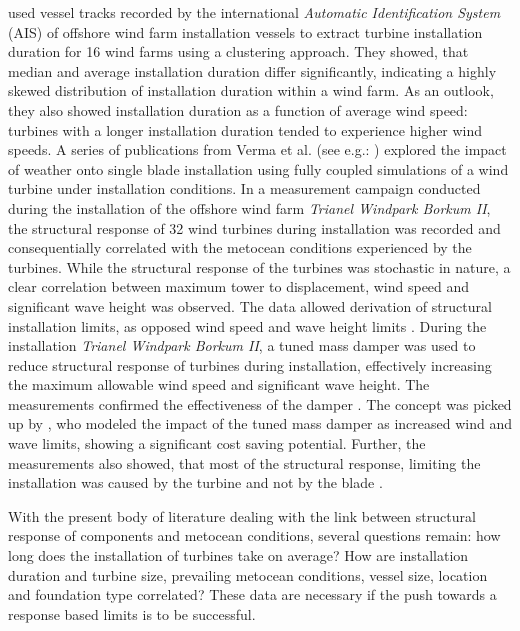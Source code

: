 \documentclass[wes, manuscript]{copernicus}
\begin{document}
\citet{tranberg_determining_2019} used vessel tracks recorded by the international \textit{Automatic Identification System} (AIS) of offshore wind farm installation vessels to extract turbine installation duration for 16 wind farms using a clustering approach. They showed, that median and average installation duration differ significantly, indicating a highly skewed distribution of installation duration within a wind farm. As an outlook, they also showed installation duration as a function of average wind speed: turbines with a longer installation duration tended to experience higher wind speeds. 
A series of publications from Verma et al. (see e.g.: \citet{verma_numerical_2017, verma_impact_2019, verma_response-based_2019, verma_comprehensive_2019, verma_effects_2020}) explored the impact of weather onto single blade installation using fully coupled simulations of a wind turbine under installation conditions. In a measurement campaign conducted during the installation of the offshore wind farm \textit{Trianel Windpark Borkum II}, the structural response of 32 wind turbines during installation was recorded and consequentially correlated with the metocean conditions experienced by the turbines. While the structural response of the turbines was stochastic in nature, a clear correlation between maximum tower to displacement, wind speed and significant wave height was observed. The data allowed derivation of structural installation limits, as 	
opposed wind speed and wave height limits \citep{sander_relative_2020, sander_oscillations_2020, sander_twbii_2020}. During the installation \textit{Trianel Windpark Borkum II}, a tuned mass damper was used to reduce structural response of turbines during installation, effectively increasing the maximum allowable wind speed and significant wave height. The measurements confirmed the effectiveness of the damper \citep{sander_monitoring_2020}. The concept was picked up by \citet{oelker_evaluation_2021}, who modeled the impact of the tuned mass damper as increased wind and wave limits, showing a significant cost saving potential. Further, the measurements also showed, that most of the structural response, limiting the installation was caused by the turbine and not by the blade \citep{stroer_statistical_2022}. 

With the present body of literature dealing with the link between structural response of components and metocean conditions, several questions remain: how long does the installation of turbines take on average? How are installation duration and turbine size, prevailing metocean conditions, vessel size, location and foundation type correlated? These data are necessary if the push towards a response based limits is to be successful. 
\end{document}
